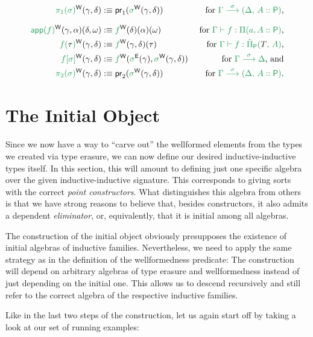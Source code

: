 \begin{defn}
\begin{defn}
\begin{align*}
\grm{\pi_1(\sigma)}^\WW(\gamma, \delta)
  &:\equiv \pr_1(\grm{\sigma}^\WW(\gamma, \delta))
  & \text{ for \grm{\IISub{\sigma}{\Gamma}{(\Delta,\,A :: \Pc)}},} \\[.7em]
\grm{\IIapp(f)}^\WW(\gamma, \alpha)(\delta, \omega)
  &:\equiv \grm{f}^\WW(\delta)(\alpha)(\omega)
  & \text{ for \grm{\Gamma \vdash f : \Pi(a, A :: \Pc)},} \\
\grm{f(\bltau)}^\WW(\gamma, \delta)
  &:\equiv \grm{f}^\WW(\gamma, \delta)(\tau)
  & \text{ for \grm{\Gamma \vdash f : \ExtPiP{T}{A}},} \\
\grm{f[\sigma]}^\WW(\gamma, \delta)
  &:\equiv \grm{f}^\WW(\grm{\sigma}^\EE(\gamma), \grm{\sigma}^\WW(\gamma, \delta))
  & \text{ for \grm{\IISub{\sigma}{\Gamma}{\Delta}}, and} \\
\grm{\pi_2(\sigma)}^\WW(\gamma, \delta)
  &:\equiv \pr_2(\grm{\sigma}^\WW(\gamma, \delta))
  & \text{ for \grm{\IISub{\sigma}{\Gamma}{(\Delta,\,A :: \Pc)}}.}
\end{align*}
\end{defn}

\section{The Initial Object}\label{sec:red-sg}

Since we now have a way to ``carve out'' the wellformed elements from the types
we created via type erasure, we can now define our desired inductive-inductive types
itself.
In this section, this will amount to defining just one specific algebra over the
given inductive-inductive signature.
This corresponds to giving sorts with the correct \emph{point constructors}.
What distinguishes this algebra from others is that we have strong reasons to believe
that, besides constructors, it also admits a dependent
\emph{eliminator}, or, equivalently, that it is initial among all algebras.

The construction of the initial object obviously presupposes the existence of
initial algebras of inductive families.
Nevertheless, we need to apply the same strategy as in the definition of the
wellformedness predicate:
The construction will depend on arbitrary algebras of type erasure and wellformedness
instead of just depending on the initial one.
This allows us to descend recursively and still refer to the correct algebra
of the respective inductive families.

Like in the last two steps of the construction, let us again start off by taking
a look at our set of running examples:


\end{defn}

